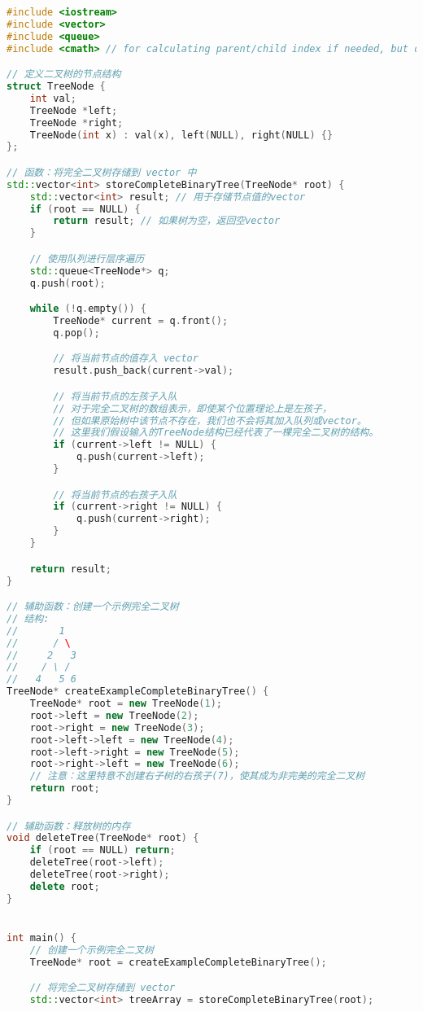 \begin{lstlisting}[language=C++]
#include <iostream>
#include <vector>
#include <queue>
#include <cmath> // for calculating parent/child index if needed, but direct level-order filling is easier

// 定义二叉树的节点结构
struct TreeNode {
    int val;
    TreeNode *left;
    TreeNode *right;
    TreeNode(int x) : val(x), left(NULL), right(NULL) {}
};

// 函数：将完全二叉树存储到 vector 中
std::vector<int> storeCompleteBinaryTree(TreeNode* root) {
    std::vector<int> result; // 用于存储节点值的vector
    if (root == NULL) {
        return result; // 如果树为空，返回空vector
    }

    // 使用队列进行层序遍历
    std::queue<TreeNode*> q;
    q.push(root);

    while (!q.empty()) {
        TreeNode* current = q.front();
        q.pop();

        // 将当前节点的值存入 vector
        result.push_back(current->val);

        // 将当前节点的左孩子入队
        // 对于完全二叉树的数组表示，即使某个位置理论上是左孩子，
        // 但如果原始树中该节点不存在，我们也不会将其加入队列或vector。
        // 这里我们假设输入的TreeNode结构已经代表了一棵完全二叉树的结构。
        if (current->left != NULL) {
            q.push(current->left);
        }

        // 将当前节点的右孩子入队
        if (current->right != NULL) {
            q.push(current->right);
        }
    }

    return result;
}

// 辅助函数：创建一个示例完全二叉树
// 结构:
//       1
//      / \
//     2   3
//    / \ /
//   4   5 6
TreeNode* createExampleCompleteBinaryTree() {
    TreeNode* root = new TreeNode(1);
    root->left = new TreeNode(2);
    root->right = new TreeNode(3);
    root->left->left = new TreeNode(4);
    root->left->right = new TreeNode(5);
    root->right->left = new TreeNode(6);
    // 注意：这里特意不创建右子树的右孩子(7)，使其成为非完美的完全二叉树
    return root;
}

// 辅助函数：释放树的内存
void deleteTree(TreeNode* root) {
    if (root == NULL) return;
    deleteTree(root->left);
    deleteTree(root->right);
    delete root;
}


int main() {
    // 创建一个示例完全二叉树
    TreeNode* root = createExampleCompleteBinaryTree();

    // 将完全二叉树存储到 vector
    std::vector<int> treeArray = storeCompleteBinaryTree(root);


\end{lstlisting}
